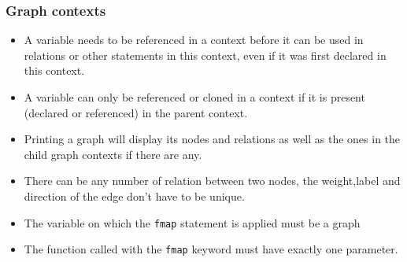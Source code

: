 \subsubsection{Graph contexts}

\begin{itemize}
    \item A variable needs to be referenced in a context before it can be used in relations or other statements in this context, even if it was first declared in this context.
\item A variable can only be referenced or cloned in a context if it is present (declared or referenced) in the parent context.
    \item Printing a graph will display its nodes and relations as well as the ones in the child graph contexts if there are any.
    \item There can be any number of relation between two nodes, the weight,label and direction of the edge don't have to be unique.
    \item The variable on which the \texttt{fmap} statement is applied must be a graph
    \item The function called with the \texttt{fmap} keyword must have exactly one parameter.
    \end{itemize}


